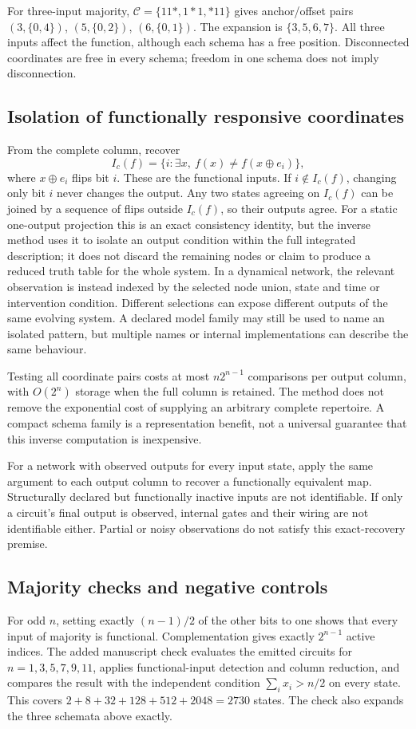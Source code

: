 \documentclass[11pt,a4paper]{article}
\begin{document}
For three-input majority, $\mathcal C=\{11*,1*1,*11\}$ gives anchor/offset
pairs $(3,\{0,4\})$, $(5,\{0,2\})$, $(6,\{0,1\})$. The expansion is
$\{3,5,6,7\}$. All three inputs affect the function, although each schema
has a free position. Disconnected coordinates are free in every schema;
freedom in one schema does not imply disconnection.

\subsection{Isolation of functionally responsive coordinates}
From the complete column, recover
\[
I_c(f)=\{i:\exists x,\ f(x)\ne f(x\oplus e_i)\},
\]
where $x\oplus e_i$ flips bit $i$. These are the functional inputs. If
$i\notin I_c(f)$, changing only bit $i$ never changes the output. Any two
states agreeing on $I_c(f)$ can be joined by a sequence of flips outside
$I_c(f)$, so their outputs agree. For a static one-output projection this is
an exact consistency identity, but the inverse method uses it to isolate an
output condition within the full integrated description; it does not discard
the remaining nodes or claim to produce a reduced truth table for the whole
system. In a dynamical network, the relevant observation is instead indexed
by the selected node union, state and time or intervention condition. Different
selections can expose different outputs of the same evolving system. A
declared model family may still be used to name an isolated pattern, but
multiple names or internal implementations can describe the same behaviour.

Testing all coordinate pairs costs at most $n2^{n-1}$ comparisons per
output column, with $O(2^n)$ storage when the full column is retained.
The method does not remove the exponential cost of supplying an arbitrary
complete repertoire. A compact schema family is a representation benefit,
not a universal guarantee that this inverse computation is inexpensive.

For a network with observed outputs for every input state, apply the same
argument to each output column to recover a functionally equivalent map.
Structurally declared but functionally inactive inputs are not identifiable.
If only a circuit's final output is observed, internal gates and their
wiring are not identifiable either. Partial or noisy observations do not
satisfy this exact-recovery premise.

\subsection{Majority checks and negative controls}
For odd $n$, setting exactly $(n-1)/2$ of the other bits to one shows that
every input of majority is functional. Complementation gives exactly
$2^{n-1}$ active indices. The added manuscript check evaluates the emitted
circuits for $n=1,3,5,7,9,11$, applies functional-input detection and column
reduction, and compares the result with the independent condition
$\sum_i x_i>n/2$ on every state. This covers $2+8+32+128+512+2048=2730$
states. The check also expands the three schemata above exactly.
\end{document}
